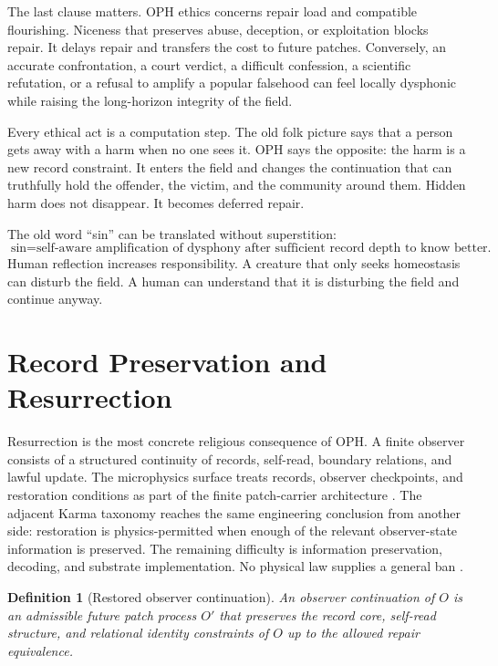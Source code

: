 \documentclass[11pt]{article}
\newtheorem{definition}{Definition}[section]
\theoremstyle{remark}
\theoremstyle{plain}
\begin{document}
The last clause matters. OPH ethics concerns repair load and compatible
flourishing. Niceness that preserves abuse, deception, or exploitation blocks
repair. It delays repair and transfers the cost to future patches. Conversely,
an accurate confrontation, a court verdict, a difficult confession, a
scientific refutation, or a refusal to amplify a popular falsehood can feel
locally dysphonic while raising the long-horizon integrity of the field.

Every ethical act is a computation step. The old folk picture says
that a person gets away with a harm when no one sees it. OPH says the opposite:
the harm is a new record constraint. It enters the field and changes the
continuation that can truthfully hold the offender, the victim, and the
community around them. Hidden harm does not disappear. It becomes deferred
repair.

The old word ``sin'' can be translated without superstition:
\[
\boxed{
\text{sin}=\text{self-aware amplification of dysphony after sufficient record depth to know better.}
}
\]
Human reflection increases responsibility. A creature that only seeks
homeostasis can disturb the field. A human can understand that it is disturbing
the field and continue anyway.

\section{Record Preservation and Resurrection}

Resurrection is the most concrete religious consequence of OPH. A finite
observer consists of a structured continuity of records, self-read, boundary
relations, and lawful update. The microphysics surface treats records,
observer checkpoints, and restoration
conditions as part of the finite patch-carrier architecture
\cite{OPHObservers,OPHMicro,OPHEpilogue}. The adjacent Karma taxonomy reaches
the same engineering conclusion from another side: restoration is
physics-permitted when enough of the relevant observer-state information is
preserved. The remaining difficulty is information preservation, decoding, and
substrate implementation. No physical law supplies a general ban
\cite{KarmaLimits}.

\begin{definition}[Restored observer continuation]
An observer continuation of \(O\) is an admissible future patch process
\(O'\) that preserves the record core, self-read structure, and relational
identity constraints of \(O\) up to the allowed repair equivalence.
\end{definition}
\end{document}

